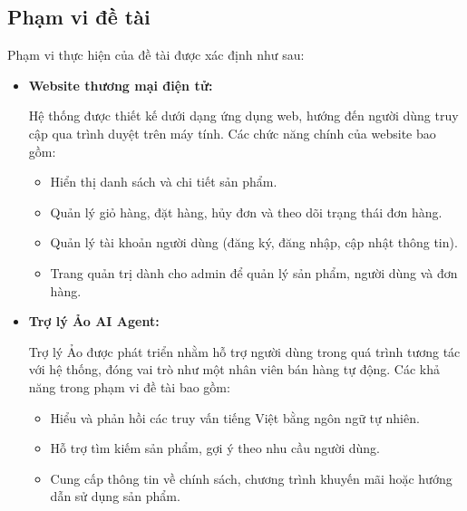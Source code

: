 \subsection{Phạm vi đề tài}

Phạm vi thực hiện của đề tài được xác định như sau:
\begin{itemize}
    \item \textbf{Website thương mại điện tử:}
    
    Hệ thống được thiết kế dưới dạng ứng dụng web, hướng đến người dùng truy cập qua trình duyệt trên máy tính. Các chức năng chính của website bao gồm:
        \begin{itemize}
            \item Hiển thị danh sách và chi tiết sản phẩm.
            \item Quản lý giỏ hàng, đặt hàng, hủy đơn và theo dõi trạng thái đơn hàng.
            \item Quản lý tài khoản người dùng (đăng ký, đăng nhập, cập nhật thông tin).
            \item Trang quản trị dành cho admin để quản lý sản phẩm, người dùng và đơn hàng.
        \end{itemize}

    \item \textbf{Trợ lý Ảo AI Agent:}
    
    Trợ lý Ảo được phát triển nhằm hỗ trợ người dùng trong quá trình tương tác với hệ thống, đóng vai trò như một nhân viên bán hàng tự động. Các khả năng trong phạm vi đề tài bao gồm:
        \begin{itemize}
            \item Hiểu và phản hồi các truy vấn tiếng Việt bằng ngôn ngữ tự nhiên.
            \item Hỗ trợ tìm kiếm sản phẩm, gợi ý theo nhu cầu người dùng.
            \item Cung cấp thông tin về chính sách, chương trình khuyến mãi hoặc hướng dẫn sử dụng sản phẩm.
        \end{itemize}
\end{itemize}
